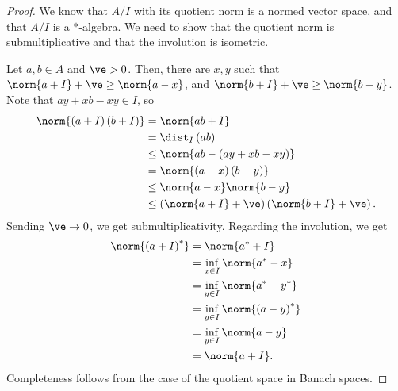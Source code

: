 \documentclass[10pt]{mypackage}
\begin{document}
\begin{proof}
  We know that $A/I$ with its quotient norm is a normed vector space, and that $A/I$ is a $\ast$-algebra. We need to show that the quotient norm is submultiplicative and that the involution is isometric.\newline

  Let $a,b\in A$ and $\ve > 0$. Then, there are $x,y$ such that $\norm{a + I} + \ve \geq \norm{a-x}$, and $\norm{b+I} + \ve \geq \norm{b-y}$. Note that $ay + xb - xy\in I$, so
  \begin{align*}
    \norm{\left(a+I\right)\left(b+I\right)} &= \norm{ab + I}\\
                                            &= \dist_{I}\left(ab\right)\\
                                            &\leq \norm{ab - \left(ay + xb - xy\right)}\\
                                            &= \norm{\left(a-x\right)\left(b-y\right)}\\
                                            &\leq \norm{a-x}\norm{b-y}\\
                                            &\leq \left(\norm{a + I} + \ve\right)\left(\norm{b+I} + \ve\right).
  \end{align*}
  Sending $\ve \rightarrow 0$, we get submultiplicativity. Regarding the involution, we get
  \begin{align*}
    \norm{\left(a + I\right)^{\ast}} &= \norm{a^{\ast} + I}\\
                                     &= \inf_{x\in I}\norm{a^{\ast}-x}\\
                                     &= \inf_{y\in I}\norm{a^{\ast}-y^{\ast}}\\
                                     &= \inf_{y\in I}\norm{\left(a-y\right)^{\ast}}\\
                                     &= \inf_{y\in I}\norm{a-y}\\
                                     &= \norm{a+I}.
  \end{align*}
  Completeness follows from the case of the quotient space in Banach spaces.
\end{proof}
\end{document}
